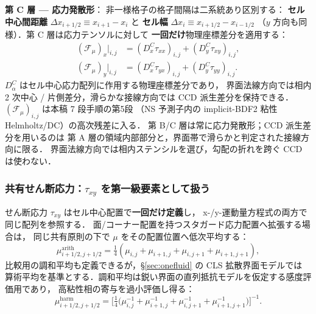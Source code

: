 \noindent\textbf{第 C 層 — 応力発散形}：
非一様格子の格子間隔は二系統あり区別する：
\textbf{セル中心間距離} $\Delta x_{i+1/2}\equiv x_{i+1}-x_i$ と
\textbf{セル幅} $\Delta x_i\equiv x_{i+1/2}-x_{i-1/2}$
（$y$ 方向も同様）．第 C 層は応力テンソルに対して
\textbf{一回だけ}物理座標差分を適用する：
\begin{align}
  (\mathcal{F}_\mu)_x\big|_{i,j}
  &= (D_x^{C}\tau_{xx})_{i,j} + (D_y^{C}\tau_{xy})_{i,j}, \label{eq:viscous_layerC_x}\\
  (\mathcal{F}_\mu)_y\big|_{i,j}
  &= (D_x^{C}\tau_{yx})_{i,j} + (D_y^{C}\tau_{yy})_{i,j}. \label{eq:viscous_layerC_y}
\end{align}
$D_\alpha^{C}$ はセル中心応力配列に作用する物理座標差分であり，
界面法線方向では相内 2 次中心 / 片側差分，滑らかな接線方向では
CCD 派生差分を保持できる．
$(\mathcal{F}_\mu)_{i,j}$ は本稿 7 段手順の第5段
（NS 予測子内の implicit-BDF2 粘性 Helmholtz/DC）の高次残差に入る．
第 B/C 層は常に応力発散形；CCD 派生差分を用いるのは
第 A 層の領域内部部分と，界面帯で滑らかと判定された接線方向に限る．
界面法線方向では相内ステンシルを選び，勾配の折れを跨ぐ CCD は使わない．

\subsubsection{\texorpdfstring{共有せん断応力：$\tau_{xy}$ を第一級要素として扱う}{共有せん断応力：τ\_{xy} を第一級要素として扱う}}
\label{sec:viscous_corner}

せん断応力 $\tau_{xy}$ はセル中心配置で\textbf{一回だけ定義}し，
x-/y-運動量方程式の両方で同じ配列を参照する．
面/コーナー配置を持つスタガード応力配置へ拡張する場合は，
同じ共有原則の下で $\mu$ をその配置位置へ低次平均する：
\begin{equation}
  \mu_{i+1/2,j+1/2}^\text{arith}
  = \tfrac{1}{4}(\mu_{i,j} + \mu_{i+1,j} + \mu_{i,j+1} + \mu_{i+1,j+1}),
  \label{eq:viscous_mu_corner_arith}
\end{equation}
比較用の調和平均も定義できるが，§\ref{sec:onefluid} の CLS 拡散界面モデルでは
算術平均を基準とする．調和平均は鋭い界面の直列抵抗モデルを仮定する感度評価用であり，
高粘性相の寄与を過小評価し得る：
\begin{equation}
  \mu_{i+1/2,j+1/2}^\text{harm}
  = \biggl[\tfrac{1}{4}\bigl(\mu_{i,j}^{-1} + \mu_{i+1,j}^{-1} + \mu_{i,j+1}^{-1} + \mu_{i+1,j+1}^{-1}\bigr)\biggr]^{-1}.
  \label{eq:viscous_mu_corner_harm}
\end{equation}

